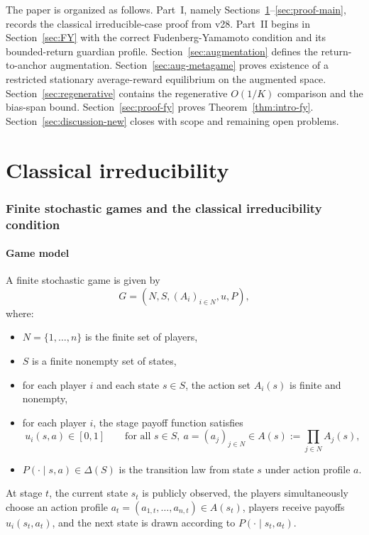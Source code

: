 \documentclass[11pt]{article}
\theoremstyle{definition}
\newcommand{\1}{\mathbf{1}}
\begin{document}
The paper is organized as follows. Part~I, namely Sections~\ref{sec:model}--\ref{sec:proof-main}, records the classical irreducible-case proof from v28. Part~II begins in Section~\ref{sec:FY} with the correct Fudenberg-Yamamoto condition and its bounded-return guardian profile. Section~\ref{sec:augmentation} defines the return-to-anchor augmentation. Section~\ref{sec:aug-metagame} proves existence of a restricted stationary average-reward equilibrium on the augmented space. Section~\ref{sec:regenerative} contains the regenerative $O(1/K)$ comparison and the bias-span bound. Section~\ref{sec:proof-fy} proves Theorem~\ref{thm:intro-fy}. Section~\ref{sec:discussion-new} closes with scope and remaining open problems.

\part{Classical irreducibility}

\section{Finite stochastic games and the classical irreducibility condition}\label{sec:model}

\subsection{Game model}

A finite stochastic game is given by
\[
G=(N,S,(A_i)_{i\in N},u,P),
\]
where:
\begin{itemize}[leftmargin=2.3em]
\item $N=\{1,\dots,n\}$ is the finite set of players,
\item $S$ is a finite nonempty set of states,
\item for each player $i$ and each state $s\in S$, the action set $A_i(s)$ is finite and nonempty,
\item for each player $i$, the stage payoff function satisfies
\[
 u_i(s,a)\in[0,1]\qquad\text{for all }s\in S,\ a=(a_j)_{j\in N}\in A(s):=\prod_{j\in N}A_j(s),
\]
\item $P(\cdot\mid s,a)\in\Delta(S)$ is the transition law from state $s$ under action profile $a$.
\end{itemize}

At stage $t$, the current state $s_t$ is publicly observed, the players simultaneously choose an action profile $a_t=(a_{1,t},\dots,a_{n,t})\in A(s_t)$, players receive payoffs $u_i(s_t,a_t)$, and the next state is drawn according to $P(\cdot\mid s_t,a_t)$.
\end{document}
